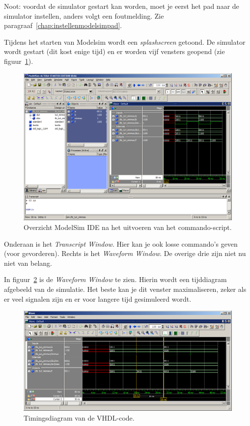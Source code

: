 \documentclass[a4paper,12pt,fleqn,twoside]{book}
\def\tutpicscale{0.455}
\begin{document}
Noot: voordat de simulator gestart kan worden, moet je eerst het pad naar de simulator instellen, 
anders volgt een foutmelding. Zie paragraaf~\ref{chap:instellenmodelsimpad}.

Tijdens het starten van Modelsim wordt een \textsl{splashscreen} getoond. De simulator wordt gestart 
(dit kost enige tijd) en er worden vijf vensters geopend (zie figuur~\ref{fig:071modelsimaftersimulationready}).

\begin{figure}[H]
\centering
\includegraphics[scale=\tutpicscale]{071modelsimaftersimulationready.png}
\caption{Overzicht ModelSim IDE na het uitvoeren van het commando-script.}
\label{fig:071modelsimaftersimulationready}
\end{figure}
 
Onderaan is het \textsl{Transcript Window}. Hier kan je ook losse commando's geven
(voor gevorderen). Rechts is het \textsl{Waveform Window}.
De overige drie zijn niet nu niet van belang.

In figuur~\ref{fig:072viewwindowonlywithmarkers} is de \textsl{Waveform Window}
te zien. Hierin wordt een tijddiagram afgebeeld van de 
simulatie. Het beste kan je dit venster maximaliseren, zeker als er veel signalen zijn en er voor 
langere tijd gesimuleerd wordt.

\begin{figure}[H]
\centering
\includegraphics[scale=\tutpicscale]{072viewwindowonlywithmarkers.png}
\caption{Timingsdiagram van de VHDL-code.}
\label{fig:072viewwindowonlywithmarkers}
\end{figure}
\end{document}
